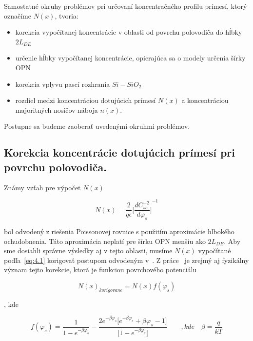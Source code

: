 \par Samostatné okruhy problémov pri určovaní koncentračného profilu
prímesí, ktorý označíme $N(x)$, tvoria:

\begin{itemize}
\item korekcia vypočítanej koncentrácie v oblasti od povrchu
  polovodiča do hĺbky $2L_{DE}$~\cite{4.7, 4.8}
\item určenie hĺbky vypočítanej koncentrácie, opierajúca sa o modely
  určenia šírky OPN~\cite{4.9, 4.10, 4.11}
\item korekcia vplyvu pascí rozhrania $Si-SiO_2$~\cite{4.12}
\item rozdiel medzi koncentráciou dotujúcich prímesí $N(x)$ a
  koncentráciou majoritných nosičov náboja $n(x)$.
\end{itemize}

Postupne sa budeme zaoberať uvedenými okruhmi problémov.

\subsection[Korekcia koncentrácie dotujúcich prímesí]{Korekcia koncentrácie dotujúcich prímesí pri povrchu polovodiča.}\label{sec:4.1.1}

Známy vzťah pre výpočet $N(x)$~\cite{I.2}

\begin{equation}\label{eq:4.1}
  N(x) = {\frac{2}{q\epsilon}} {\Bigg[\frac{dC_{sc}^{-2}}{d\varphi_{s}}\Bigg]}^{-1}
\end{equation}

bol odvodený z riešenia Poissonovej rovnice s použitím aproximácie
hlbokého ochudobnenia. Táto aproximácia neplatí pre šírku OPN menšiu
ako $2L_{DE}$.  Aby sme dosiahli správne výsledky aj v tejto oblasti,
musíme $N(x)$ vypočítané podľa~\ref{eq:4.1} korigovať postupom
odvodeným v~\cite{4.7, 4.8}. Z práce~\cite{4.7} je zrejmý aj
fyzikálny význam tejto korekcie, ktorá je funkciou povrchového
potenciálu

\begin{equation}\label{eq:4.2}
  {N(x)}_{korigovane} = N(x)f(\varphi_{s})
\end{equation}

, kde

\begin{equation}\label{eq:4.3}
  f(\varphi_{s}) = {\frac{1}{1-e^{-\beta\varphi_{s}}}} - {\frac{2e^{-\beta\varphi_{s}}\big[e^{-\beta\varphi_{s}}+\beta\varphi_{s} - 1\big]}{\big[1 - e^{-\beta\varphi_{s}}\big]}} \qquad,kde\quad \beta=\frac{q}{kT}
\end{equation}

